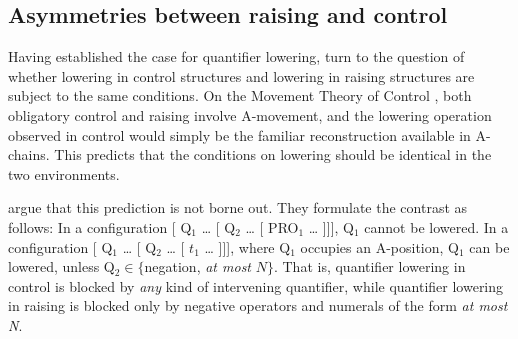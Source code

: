 \documentclass[12pt]{article}
\begin{document}
\subsection{Asymmetries between raising and control}\label{sec:nt-asymmetries}

Having established the case for quantifier lowering, \citeauthor{neeleman2006} turn to the question of whether lowering in control structures and lowering in raising structures are subject to the same conditions. On the Movement Theory of Control \citep{hornstein1999}, both obligatory control and raising involve A-movement, and the lowering operation observed in control would simply be the familiar reconstruction available in A-chains. This predicts that the conditions on lowering should be identical in the two environments.

\citeauthor{neeleman2006} argue that this prediction is not borne out. They formulate the contrast as follows:
%
\pex\label{ex:nt-generalization}
\a\label{ex:nt-gen-ctrl} In a configuration [ Q$_1$ \ldots{} [ Q$_2$ \ldots{} [ PRO$_1$ \ldots{} ]]], Q$_1$ cannot be lowered.
\a\label{ex:nt-gen-raise} In a configuration [ Q$_1$ \ldots{} [ Q$_2$ \ldots{} [ $t_1$ \ldots{} ]]], where Q$_1$ occupies an A-position, Q$_1$ can be lowered, unless Q$_2 \in \{$negation, \emph{at most} $N\}$.
\xe
%
That is, quantifier lowering in control is blocked by \emph{any} kind of intervening quantifier, while quantifier lowering in raising is blocked only by negative operators and numerals of the form \emph{at most N}.
\end{document}
